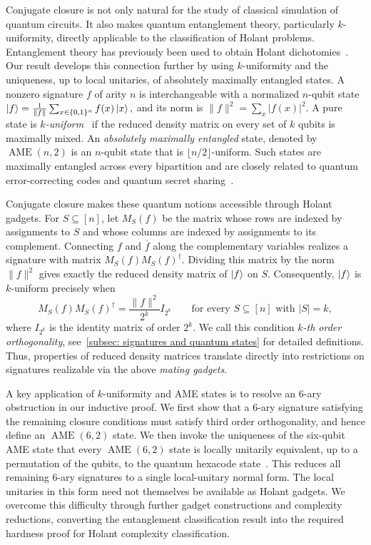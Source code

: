 Conjugate closure is not only natural for the study of classical simulation of quantum circuits. It also makes quantum entanglement theory, particularly $k$-uniformity, directly applicable to the classification of Holant problems. Entanglement theory has previously been used to obtain Holant dichotomies~\cite{Backens-holant-plus,Backens-Holant-c,odd_holant_real}. Our result develops this connection further by using $k$-uniformity and the uniqueness, up to local unitaries, of absolutely maximally entangled states.
A nonzero signature $f$ of arity $n$ is interchangeable with a normalized $n$-qubit state
$\ket f=\frac{1}{\lVert f\rVert}
    \sum_{x\in\{0,1\}^n}f(x)\ket x,$ and its norm is $ \lVert f\rVert^2=\sum_x|f(x)|^2$.
A pure state is \emph{$k$-uniform}~\cite{scott2004} if the reduced density matrix on every set of $k$ qubits is maximally mixed. 
An \emph{absolutely maximally entangled} state, denoted by $\operatorname{AME}(n,2)$ is an $n$-qubit state that is $\lfloor n/2\rfloor$-uniform. Such states are maximally entangled across every bipartition and are closely related to quantum error-correcting codes and quantum secret sharing~\cite{scott2004,helwig2012}.

Conjugate closure makes these quantum notions accessible through Holant gadgets. For $S\subseteq[n]$, let $M_S(f)$ be the matrix whose rows are indexed by assignments to $S$ and whose columns are indexed by assignments to its complement. Connecting $f$ and $\overline f$ along the complementary variables realizes a signature with matrix $M_S(f)M_S(f)^\dagger$. Dividing this matrix by the norm $\lVert f\rVert^2$ gives exactly the reduced density matrix of $\ket f$ on $S$. Consequently, $\ket f$ is $k$-uniform precisely when
\[
    M_S(f)M_S(f)^\dagger
    =\frac{\lVert f\rVert^2}{2^k}I_{2^k}
    \qquad\text{for every }S\subseteq[n]\text{ with }|S|=k,
\]
where $I_{2^k}$ is the identity matrix of order $2^k$.
We call this condition \emph{$k$-th order orthogonality}, see~\cref{subsec: signatures and quantum states} for detailed definitions. Thus, properties of reduced density matrices translate directly into restrictions on  signatures realizable via the above \emph{mating gadgets}.

A key application of $k$-uniformity and AME states is to resolve an $6$-ary obstruction in our inductive proof. 
We first show that a $6$-ary signature satisfying the remaining closure conditions must satisfy third order orthogonality, and hence define an $\operatorname{AME}(6,2)$ state. 
We then invoke the uniqueness of the six-qubit AME state that every $\operatorname{AME}(6,2)$ state is locally unitarily equivalent, up to a permutation of the qubits, to the quantum hexacode state~\cite{rains1999quantum}. This reduces all remaining $6$-ary signatures to a single local-unitary normal form. The local unitaries in this form need not themselves be available as Holant gadgets. We overcome this difficulty through further gadget constructions and complexity reductions, converting the entanglement classification result into the required hardness proof for Holant complexity classification.

